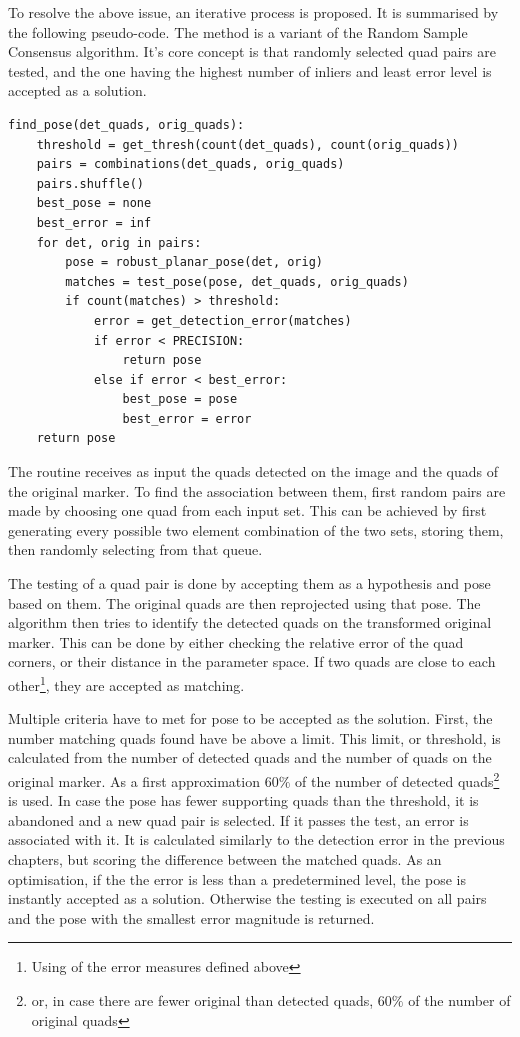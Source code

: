 To resolve the above issue, an iterative process is proposed.
It is summarised by the following pseudo-code.
The method is a variant of the Random Sample Consensus algorithm.
It's core concept is that randomly selected quad pairs are tested, and the one having the highest number of inliers and least error level is accepted as a solution.
\begin{lstlisting}
find_pose(det_quads, orig_quads):
    threshold = get_thresh(count(det_quads), count(orig_quads))
    pairs = combinations(det_quads, orig_quads)
    pairs.shuffle()
    best_pose = none
    best_error = inf
    for det, orig in pairs:
        pose = robust_planar_pose(det, orig)
        matches = test_pose(pose, det_quads, orig_quads)
        if count(matches) > threshold:
            error = get_detection_error(matches)
            if error < PRECISION:
                return pose
            else if error < best_error:
                best_pose = pose
                best_error = error
    return pose
\end{lstlisting}

The routine receives as input the quads detected on the image and the quads of the original marker.
To find the association between them, first random pairs are made by choosing one quad from each input set.
This can be achieved by first generating every possible two element combination of the two sets, storing them, then randomly selecting from that queue.

The testing of a quad pair is done by accepting them as a hypothesis and pose based on them.
The original quads are then reprojected using that pose.
The algorithm then tries to identify the detected quads on the transformed original marker.
This can be done by either checking the relative error of the quad corners, or their distance in the parameter space.
If two quads are close to each other\footnote{Using of the error measures defined above}, they are accepted as matching.

Multiple criteria have to met for pose to be accepted as the solution.
First, the number matching quads found have be above a limit.
This limit, or threshold, is calculated from the number of detected quads and the number of quads on the original marker.
As a first approximation $60\%$ of the number of detected quads\footnote{or, in case there are fewer original than detected quads, $60\%$ of the number of original quads} is used.
In case the pose has fewer supporting quads than the threshold, it is abandoned and a new quad pair is selected.
If it passes the test, an error is associated with it.
It is calculated similarly to the detection error in the previous chapters, but scoring the difference between the matched quads.
As an optimisation, if the the error is less than a predetermined level, the pose is instantly accepted as a solution.
Otherwise the testing is executed on all pairs and the pose with the smallest error magnitude is returned.

